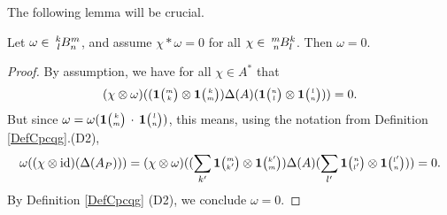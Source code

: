 The following lemma will be crucial.

\begin{Lem}\label{LemRefSep} Let $\omega \in \Gr{B}{k}{m}{l}{n}$, and assume $\chi*\omega =  0$ for all $\chi \in \Gr{B}{m}{k}{n}{l}$. Then $\omega =0$.
\end{Lem} 
\begin{proof} By assumption, we have for all $\chi\in A^*$ that \[(\chi\otimes \omega)((\UnitC{m}{k}\otimes \UnitC{k}{m})\Delta(A)(\UnitC{n}{l}\otimes \UnitC{l}{n}))=0.\] But since $\omega = \omega(\UnitC{k}{m}\,\cdot\,\UnitC{l}{n})$, this means, using the notation from Definition \ref{DefCpcqg}.(D2), \[\omega((\chi\otimes \id)(\Delta(A_P))) =(\chi\otimes \omega)((\sum_{k'}\UnitC{m}{k'}\otimes \UnitC{k'}{m})\Delta(A)(\sum_{l'}\UnitC{n}{l'}\otimes \UnitC{l'}{n})) =0.\] By Definition \ref{DefCpcqg} (D2), we conclude $\omega=0$.
\end{proof} 


